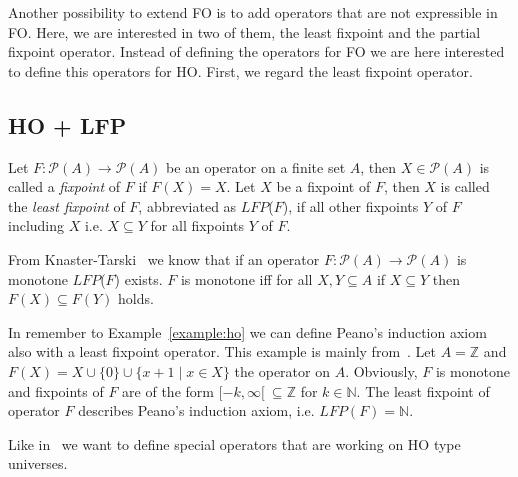 Another possibility to extend FO is to add operators that are not expressible in FO. Here, we are interested in two
of them, the least fixpoint and the partial fixpoint operator. Instead of defining the operators for FO we are
here interested to define this operators for HO. First, we regard the least fixpoint operator.

\subsection{HO + LFP}
\label{subsec:hoPlusLfp}

\begin{definition}
   Let $F\colon \mathscr{P}(A) \rightarrow \mathscr{P}(A)$ be an operator on a finite set $A$, then $X \in \mathscr{P}
   (A)$
   is called a \emph{fixpoint} of $F$ if $F(X) = X$. Let $X$ be a fixpoint of $F$, then $X$ is called the \emph{least
   fixpoint} of $F$, abbreviated as $\mathit{LFP}$($F$), if all other fixpoints $Y$ of $F$ including $X$ i.e. $X
   \subseteq Y$ for all fixpoints $Y$ of $F$.
\end{definition}

From Knaster-Tarski~\cite{tarski1955lattice} we know that if an operator $F\colon \mathscr{P}(A) \rightarrow
\mathscr{P}(A)$ is monotone $\mathit{LFP}$($F$) exists. $F$ is monotone iff for all $X, Y \subseteq A$ if $X
\subseteq Y$ then $F(X) \subseteq F(Y)$ holds.

\begin{example}
    \label{example:lfp}
    In remember to Example~\ref{example:ho} we can define Peano's induction axiom also with a least fixpoint
    operator. This example is mainly from~\cite{hetzl2017higher}. Let $A = \mathbb{Z}$ and $F(X) = X \cup \{0\} \cup
    \{x + 1 \mid x \in X\}$ the operator on $A$. Obviously, $F$ is monotone and fixpoints of $F$ are of the form
    $[-k, \infty[~\subseteq\mathbb{Z}$ for $k \in \mathbb{N}$. The least fixpoint of operator $F$ describes Peano's
    induction axiom, i.e. $\mathit{LFP}(F) = \mathbb{N}$.
\end{example}

Like in~\cite{freireMartins2011descriptive} we want to define special operators that are working on HO type
universes.

